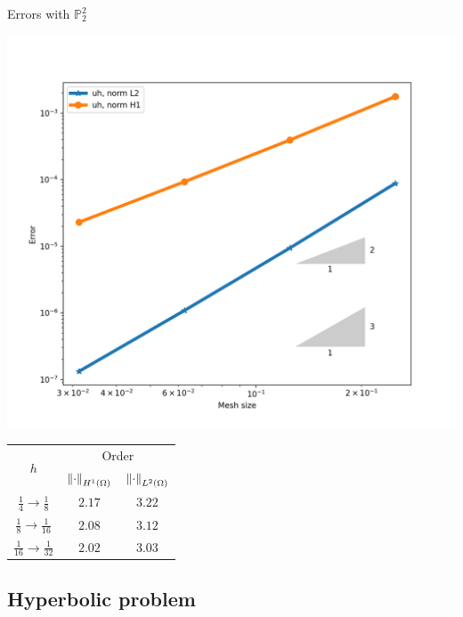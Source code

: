 	\begin{frame}{Errors with $\mathbb{P}^2_2$}
		\begin{minipage}{0.50\textwidth}
			\centering
			\includegraphics[scale=0.30]{img/Difusion/errores_difusion_P2c.png}
		\end{minipage}
		\begin{minipage}{0.49\textwidth}
			\centering
			\begin{tabular}{|c|c|c|}
				\hline 
				\multirow{2}{*}{$h$} & \multicolumn{2}{c|}{Order} \\
				\cline{2-3}
				 & $\left\|\cdot\right\|_{H^1(\Omega)}$ & $\left\|\cdot\right\|_{L^2(\Omega)}$\\ 
				\hline
				\hline
				$\frac{1}{4}\to\frac{1}{8}$ & $2.17$ & $3.22$  \\ 
				\hline 
				$\frac{1}{8}\to\frac{1}{16}$ & $2.08$ & $3.12$ \\ 
				\hline 
				$\frac{1}{16}\to\frac{1}{32}$ & $2.02$ & $3.03$ \\
				\hline
			\end{tabular}
		\end{minipage}
		\end{frame}

\subsection{Hyperbolic problem}

